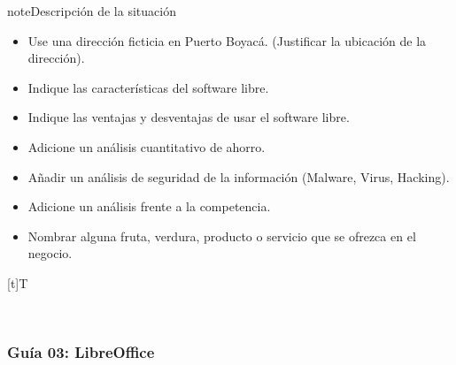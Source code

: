 \documentclass[letterpaper,10pt,spanish]{sphinxmanual}
\let\sphinxpxdimen\pdfpxdimen\else\newdimen\sphinxpxdimen
\begin{document}
\begin{sphinxadmonition}{note}{Descripción de la situación}
\begin{enumerate}
\begin{itemize}
\item {} 
\sphinxAtStartPar
Use una dirección ficticia en Puerto Boyacá. (Justificar la ubicación de la dirección).

\item {} 
\sphinxAtStartPar
Indique las características del software libre.

\item {} 
\sphinxAtStartPar
Indique las ventajas y desventajas de usar el software libre.

\item {} 
\sphinxAtStartPar
Adicione un análisis cuantitativo de ahorro.

\item {} 
\sphinxAtStartPar
Añadir un análisis de seguridad de la información (Malware, Virus, Hacking).

\item {} 
\sphinxAtStartPar
Adicione un análisis frente a la competencia.

\item {} 
\sphinxAtStartPar
Nombrar alguna fruta, verdura, producto o servicio que se ofrezca en el negocio.

\end{itemize}


\begin{savenotes}\sphinxattablestart
\sphinxthistablewithglobalstyle
\centering
\begin{tabulary}{\linewidth}[t]{T}
\sphinxtoprule
\sphinxtableatstartofbodyhook

\begin{sphinxfigure-in-table}
\centering
\capstart
\noindent\sphinxincludegraphics[width=400\sphinxpxdimen]{{image022}.png}
\label{\detokenize{cursos/ofimatica10/periodo01/G02:id2}}\end{sphinxfigure-in-table}\relax
\\
\sphinxbottomrule
\end{tabulary}
\sphinxtableafterendhook\par
\sphinxattableend\end{savenotes}

\end{enumerate}
\end{sphinxadmonition}

\sphinxstepscope


\subsubsection{Guía 03: LibreOffice}
\label{\detokenize{cursos/ofimatica10/periodo01/G03:guia-03-libreoffice}}\label{\detokenize{cursos/ofimatica10/periodo01/G03::doc}}
\end{document}
